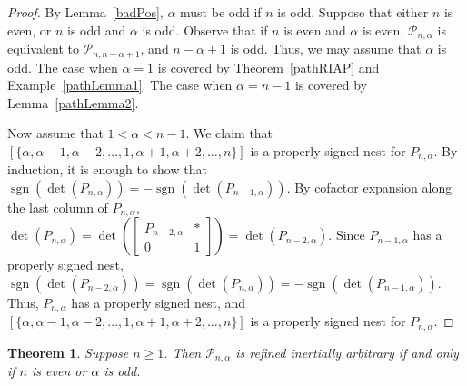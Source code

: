 \documentclass[10pt]{amsart}
\newtheorem{theorem}[proposition]{Theorem}
\begin{document}
\begin{proof}
By Lemma~\ref{badPos}, $\alpha$ must be odd if $n$ is odd. Suppose that either $n$ is even, or $n$ is odd and $\alpha$ is odd. Observe that if $n$ is even and $\alpha$ is even, ${\mathcal{P}}_{n, \alpha}$ is equivalent to ${\mathcal{P}}_{n, n-\alpha+1}$, and $n-\alpha+1$ is odd. Thus, we may assume that $\alpha$ is odd.
The case when $\alpha=1$ is covered by Theorem~\ref{pathRIAP} and Example~\ref{pathLemma1}. The case when
$\alpha=n-1$ is covered by Lemma~\ref{pathLemma2}. 
 
Now assume  
that $1 < \alpha < n-1$. 
We claim that $\left[\{\alpha, \alpha-1, \alpha-2,\ldots,1, \alpha+1, \alpha+2,\ldots,n\}\right]$ is a properly signed nest for $P_{n, \alpha}$. 
By induction, it is enough to show that $\operatorname{sgn}(\det(P_{n, \alpha})) = - \operatorname{sgn}(\det(P_{n-1, \alpha}))$. 
By cofactor expansion along the last column of $P_{n, \alpha}$, 
$\det(P_{n, \alpha}) = \det\left(\left[ \begin{array}{cc}
P_{n-2, \alpha} 	& * \\
0 		& 1 \end{array} \right] \right) = \det(P_{n-2, \alpha}).$ 
Since $P_{n-1, \alpha}$ has a properly signed nest, $\operatorname{sgn}(\det(P_{n-2, \alpha})) = \operatorname{sgn}(\det(P_{n, \alpha})) 
= -\operatorname{sgn}(\det(P_{n-1, \alpha}))$. Thus, $P_{n, \alpha}$ has a properly signed nest, and $\left[\{\alpha, \alpha-1, \alpha-2,\ldots,1, \alpha+1, \alpha+2, \ldots,n\}\right]$ is a properly signed nest for $P_{n, \alpha}$.
\end{proof}

\begin{theorem}\label{patheorem} Suppose $n\geq 1$. Then 
${\mathcal{P}}_{n, \alpha}$ is refined inertially arbitrary if and only if $n$ is even or $\alpha$ is odd.
\end{theorem}
\end{document}
